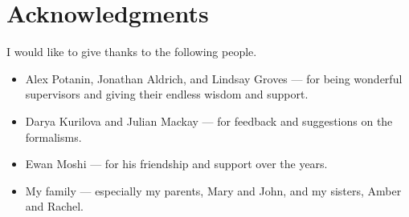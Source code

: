 \chapter*{Acknowledgments}\label{C:ack} 

I would like to give thanks to the following people.

\begin{itemize}

	\item Alex Potanin, Jonathan Aldrich, and Lindsay Groves --- for being wonderful supervisors and giving their endless wisdom and support.
	
	\item Darya Kurilova and Julian Mackay --- for feedback and suggestions on the formalisms.
	
	\item Ewan Moshi --- for his friendship and support over the years.
	
	\item My family --- especially my parents, Mary and John, and my sisters, Amber and Rachel.

\end{itemize}

